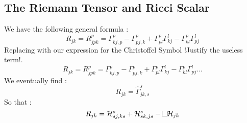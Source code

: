 \documentclass{article}
\begin{document}
    \subsection{The Riemann Tensor and Ricci Scalar}
        We have the following general formula :
        \begin{equation}
            R_{jk}=R^p_{jpk}=\Gamma^p_{kj,p}-\Gamma^p_{pj,k}+\Gamma^p_{pl}\Gamma^l_{kj}-\Gamma^p_{kl}\Gamma^l_{pj}
        \end{equation}
        Replacing with our expression for the Christoffel Symbol !Justify the useless term!.
        \begin{equation*}
            R_{jk}=R^p_{jpk}=\Gamma^p_{kj,p}-\Gamma^p_{pj,k}+\Gamma^p_{pl}\Gamma^l_{kj}-\Gamma^p_{kl}\Gamma^l_{pj}
            ...
        \end{equation*}
        We eventually find :
        \begin{equation*}
            R_{jk}=\hat{\Gamma}^s_{jk,s}
        \end{equation*}
        So that :
        \begin{equation*}
            R_{jk}=\mathcal{H}^s_{sj,ks}+\mathcal{H}^s_{sk,js}-\framebox(7,7){}\mathcal{H}_{jk}
        \end{equation*}
\end{document}
